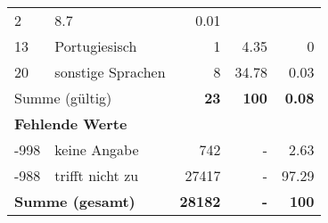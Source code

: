\begin{longtable}{lXrrr}
       \num{2} &
       \num[round-mode=places,round-precision=2]{8.7} &
         \num[round-mode=places,round-precision=2]{0.01} \\

     13 &
     \multicolumn{1}{X}{ Portugiesisch   } &


       \num{1} &
       \num[round-mode=places,round-precision=2]{4.35} &
         \num[round-mode=places,round-precision=2]{0} \\

     20 &
     \multicolumn{1}{X}{ sonstige Sprachen   } &


       \num{8} &
       \num[round-mode=places,round-precision=2]{34.78} &
         \num[round-mode=places,round-precision=2]{0.03} \\
     \midrule
     \multicolumn{2}{l}{Summe (gültig)} &
       \textbf{\num{23}} &
     \textbf{\num{100}} &
       \textbf{\num[round-mode=places,round-precision=2]{0.08}} \\
     \multicolumn{5}{l}{\textbf{Fehlende Werte}}\\
       -998 &
       keine Angabe &
         \num{742} &
        - &
         \num[round-mode=places,round-precision=2]{2.63} \\
       -988 &
       trifft nicht zu &
         \num{27417} &
        - &
         \num[round-mode=places,round-precision=2]{97.29} \\
     \midrule
     \multicolumn{2}{l}{\textbf{Summe (gesamt)}} &
          \textbf{\num{28182}} &
        \textbf{-} &
        \textbf{\num{100}} \\
     \bottomrule
     \end{longtable}
     
